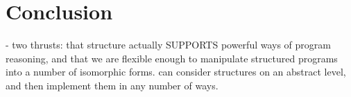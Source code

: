 \section{Conclusion}

- two thrusts: that structure actually SUPPORTS powerful ways of
program reasoning, and that we are flexible enough to manipulate
structured programs into a number of isomorphic forms.  can consider
structures on an abstract level, and then implement them in any number
of ways.

